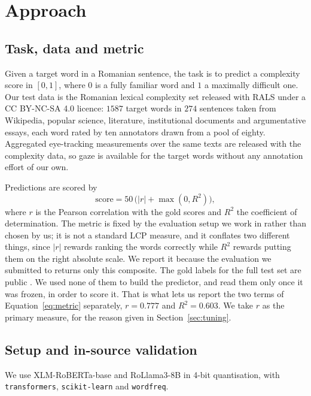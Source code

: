 \section{Approach}
\label{section:approach}

\subsection{Task, data and metric}

Given a target word in a Romanian sentence, the task is to predict a
complexity score in $[0,1]$, where $0$ is a fully familiar word and $1$
a maximally difficult one. Our test data is the Romanian lexical
complexity set released with RALS \citep{anghel-etal-2025-rals} under a
CC BY-NC-SA 4.0 licence: $1587$ target words in $274$ sentences taken
from Wikipedia, popular science, literature, institutional documents and
argumentative essays, each word rated by ten annotators drawn from a pool
of eighty. Aggregated eye-tracking measurements over the same texts are
released with the complexity data, so gaze is available for the target
words without any annotation effort of our own.

Predictions are scored by
\begin{equation}
  \label{eq:metric}
  \mathrm{score} = 50\,\bigl(|r| + \max(0, R^2)\bigr),
\end{equation}
where $r$ is the Pearson correlation with the gold scores and $R^2$ the
coefficient of determination. The metric is fixed by the evaluation
setup we work in rather than chosen by us; it is not a standard LCP
measure, and it conflates two different things, since $|r|$ rewards
ranking the words correctly while $R^2$ rewards putting them on the
right absolute scale. We report it because the evaluation we submitted to
returns only this composite. The gold labels for the full test set are
public \citep{anghel-etal-2025-rals}. We used none of them to build the
predictor, and read them only once it was frozen, in order to score it.
That is what lets us report the two terms of Equation~\ref{eq:metric}
separately, $r = 0.777$ and $R^2 = 0.603$. We take $r$ as the primary
measure, for the reason given in Section~\ref{sec:tuning}.

\subsection{Setup and in-source validation}

We use XLM-RoBERTa-base \citep{conneau2020xlmr} and RoLlama3-8B
\citep{masala-etal-2024-vorbesti} in 4-bit quantisation, with
\texttt{transformers}, \texttt{scikit-learn} and \texttt{wordfreq}.


